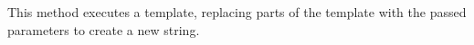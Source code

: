 This method executes a template, replacing parts of the template with the passed parameters to create a new string.

